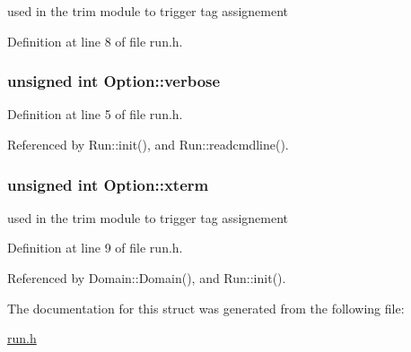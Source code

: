 used in the trim module to trigger tag assignement 



Definition at line 8 of file run.h.\hypertarget{structOption_798cf97922f0ec0f4ecc226f52684f41}{
\subsubsection[{verbose}]{\setlength{\rightskip}{0pt plus 5cm}unsigned int {\bf Option::verbose}}}
\label{structOption_798cf97922f0ec0f4ecc226f52684f41}




Definition at line 5 of file run.h.

Referenced by Run::init(), and Run::readcmdline().\hypertarget{structOption_8eb54edb09717cfc01a421f5610bbb8e}{
\subsubsection[{xterm}]{\setlength{\rightskip}{0pt plus 5cm}unsigned int {\bf Option::xterm}}}
\label{structOption_8eb54edb09717cfc01a421f5610bbb8e}


used in the trim module to trigger tag assignement 



Definition at line 9 of file run.h.

Referenced by Domain::Domain(), and Run::init().

The documentation for this struct was generated from the following file:\begin{CompactItemize}
\item 
\hyperlink{run_8h}{run.h}\end{CompactItemize}
